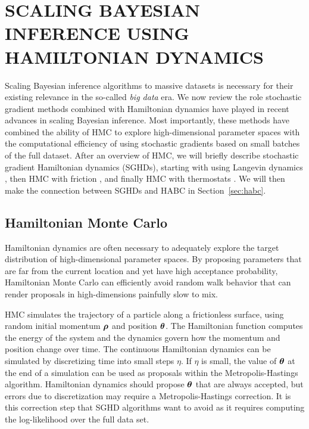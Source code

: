 \documentclass[]{article}
\begin{document}
\section{SCALING BAYESIAN INFERENCE USING HAMILTONIAN DYNAMICS} \label{sec:scaling}
Scaling Bayesian inference algorithms to massive datasets is necessary for their existing relevance in the so-called {\em big data} era.  We now review the role stochastic gradient methods combined with Hamiltonian dynamics have played in recent advances in scaling Bayesian inference.   Most importantly, these methods have combined the ability of HMC to explore high-dimensional parameter spaces with the computational efficiency of using stochastic gradients based on small batches of the full dataset.  After an overview of HMC, we will briefly describe stochastic gradient Hamiltonian dynamics (SGHDs), starting with using  Langevin dynamics \cite{welling2011bayesian}, then HMC with friction \cite{chen2014stochastic}, and finally HMC with thermostats \cite{ding2014bayesian}.  We will then make the connection between SGHDs and HABC in Section~\ref{sec:habc}.

\subsection{Hamiltonian Monte Carlo}\label{sec:hmc}

Hamiltonian dynamics are often necessary to adequately explore the target distribution of high-dimensional parameter spaces.  By proposing parameters that are far from the current location and yet have high acceptance probability, Hamiltonian Monte Carlo \cite{duane1987hybrid, neal2011mcmc}  can efficiently avoid random walk behavior that can render proposals in high-dimensions painfully slow to mix.

HMC simulates the trajectory of a particle along a frictionless surface, using random initial momentum ${\bm \rho}$ and position ${\bm \theta}$.  The Hamiltonian function computes the energy of the system and the dynamics govern how the momentum and position change over time.  The continuous Hamiltonian dynamics can be simulated by discretizing time into small steps $\eta$.  If $\eta$ is small, the value of ${\bm \theta}$ at the end of a simulation can be used as proposals within the Metropolis-Hastings algorithm.  Hamiltonian dynamics should propose ${\bm \theta}$ that are always accepted, but errors due to discretization may require a  Metropolis-Hastings correction.  It is this correction step that SGHD algorithms want to avoid as it requires computing the log-likelihood over the full data set.
\end{document}
